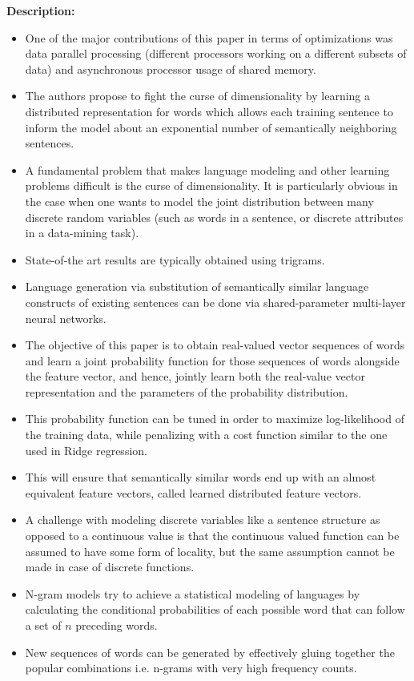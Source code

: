 \documentclass[11pt,a4paper]{article}
\begin{document}
  \textbf{Description:}
  \begin{itemize}
    \item
    One of the major contributions of this paper in terms of optimizations was data parallel processing (different processors working on a different subsets of data) and asynchronous processor usage of shared memory.
    \item
    The authors propose to fight the curse of dimensionality by learning a distributed representation for words which allows each training sentence to inform the model about an exponential number of semantically neighboring sentences.
    \item
    A fundamental problem that makes language modeling and other learning problems difficult is the curse of dimensionality. It is particularly obvious in the case when one wants to model the joint distribution between many discrete random variables (such as words in a sentence, or discrete attributes in a data-mining task).
    \item
    State-of-the art results are typically obtained using trigrams.
    \item
    Language generation via substitution of semantically similar language constructs of existing sentences can be done via shared-parameter multi-layer neural networks.
    \item
    The objective of this paper is to obtain real-valued vector sequences of words and learn a joint probability function for those sequences of words alongside the feature vector, and hence, jointly learn both the real-value vector representation and the parameters of the probability distribution.
    \item
    This probability function can be tuned in order to maximize log-likelihood of the training data, while penalizing with a cost function similar to the one used in Ridge regression.
    \item
    This will ensure that semantically similar words end up with an almost equivalent feature vectors, called learned distributed feature vectors.
    \item
    A challenge with modeling discrete variables like a sentence structure as opposed to a continuous value is that the continuous valued function can be assumed to have some form of locality, but the same assumption cannot be made in case of discrete functions.
    \item
    N-gram models try to achieve a statistical modeling of languages by calculating the conditional probabilities of each possible word that can follow a set of $n$ preceding words.
    \item
    New sequences of words can be generated by effectively gluing together the popular combinations i.e. n-grams with very high frequency counts.
  \end{itemize}
\end{document}
